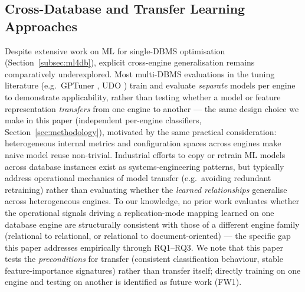 \documentclass[iicol,pdflatex,sn-mathphys-num]{sn-jnl}
\theoremstyle{thmstyleone}
\theoremstyle{thmstylethree}
\begin{document}
\subsection{Cross-Database and Transfer Learning Approaches}\label{subsec:crossdb}

Despite extensive work on ML for single-DBMS optimisation
(Section~\ref{subsec:ml4db}), explicit cross-engine generalisation
remains comparatively underexplored. Most multi-DBMS evaluations in
the tuning literature (e.g.\ GPTuner \cite{lao2024},
UDO \cite{wang2021udo}) train and evaluate \emph{separate} models per
engine to demonstrate applicability, rather than testing whether a
model or feature representation \emph{transfers} from one engine to
another --- the same design choice we make in this paper (independent
per-engine classifiers, Section~\ref{sec:methodology}), motivated by
the same practical consideration: heterogeneous internal metrics and
configuration spaces across engines make naive model reuse
non-trivial. Industrial efforts to copy or retrain ML models across
database instances exist as systems-engineering patterns, but
typically address operational mechanics of model transfer (e.g.\
avoiding redundant retraining) rather than evaluating whether the
\emph{learned relationships} generalise across heterogeneous engines.
To our knowledge, no prior work evaluates whether the operational
signals driving a replication-mode mapping learned on one database
engine are structurally consistent with those of a different engine
family (relational to relational, or relational to document-oriented)
--- the specific gap this paper addresses empirically through RQ1--RQ3.
We note that this paper tests the \emph{preconditions} for transfer
(consistent classification behaviour, stable feature-importance
signatures) rather than transfer itself; directly training on one
engine and testing on another is identified as future work (FW1).
\end{document}
